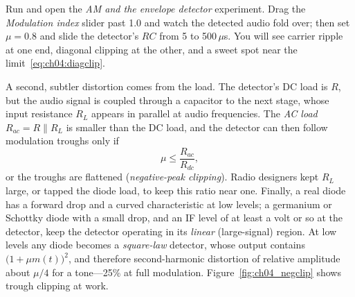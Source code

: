 \begin{tryit}
Run  and open the \emph{AM and the envelope detector} experiment.
Drag the \emph{Modulation index} slider past 1.0 and watch the detected audio fold over; then set $\mu=0.8$
and slide the detector's $RC$ from 5 to 500\,$\mu$s. You will see carrier ripple at one end, diagonal
clipping at the other, and a sweet spot near the limit~\eqref{eq:ch04:diagclip}.
\end{tryit}

A second, subtler distortion comes from the load. The detector's DC load is $R$, but the audio signal is
coupled through a capacitor to the next stage, whose input resistance $R_L$ appears in parallel at audio
frequencies. The \emph{AC load} $R_{ac}=R\parallel R_L$ is smaller than the DC load, and the detector can
then follow modulation troughs only if
\begin{equation}
\mu\le\frac{R_{ac}}{R_{dc}},
\label{eq:ch04:negclip}
\end{equation}
or the troughs are flattened (\emph{negative-peak clipping}). Radio designers kept $R_L$ large, or tapped
the diode load, to keep this ratio near one. Finally, a real diode has a forward drop and a curved
characteristic at low levels; a germanium or Schottky diode with a small drop, and an IF level of at
least a volt or so at the detector, keep the detector operating in its \emph{linear} (large-signal)
region. At low levels any diode becomes a \emph{square-law} detector, whose output contains
$\big(1+\mu m(t)\big)^2$, and therefore second-harmonic distortion of relative amplitude about $\mu/4$ for
a tone---25\% at full modulation. Figure~\ref{fig:ch04_negclip} shows trough clipping at work.


